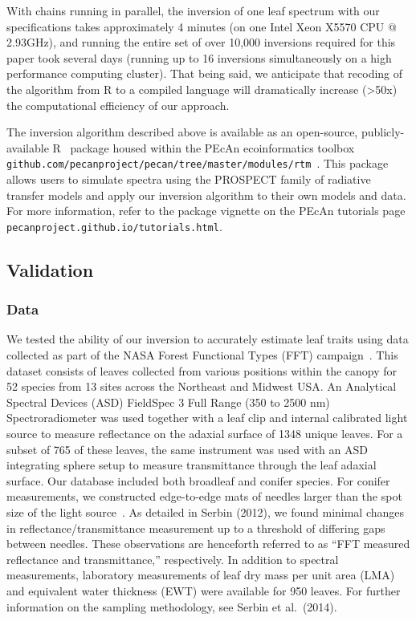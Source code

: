 With chains running in parallel, the inversion of one leaf spectrum with our specifications takes approximately 4 minutes (on one Intel Xeon X5570 CPU @ 2.93GHz), and running the entire set of over 10,000 inversions required for this paper took several days (running up to 16 inversions simultaneously on a high performance computing cluster).
That being said, we anticipate that recoding of the algorithm from R to a compiled language will dramatically increase (>50x) the computational efficiency of our approach.

The inversion algorithm described above is available as an open-source, publicly-available R~\cite{rstats} package housed within the PEcAn ecoinformatics toolbox \texttt{github.com/pecanproject/pecan/tree/master/modules/rtm}~\cite{dietze_improving_2013,lebauer_facilitating_2013}.
This package allows users to simulate spectra using the PROSPECT family of radiative transfer models and apply our inversion algorithm to their own models and data.
For more information, refer to the package vignette on the PEcAn tutorials page \texttt{pecanproject.github.io/tutorials.html}.

\subsection{Validation}

\subsubsection{Data}

We tested the ability of our inversion to accurately estimate leaf traits using data collected as part of the NASA Forest Functional Types (FFT) campaign~\cite{deel_2012_relationship,serbin_spectroscopic_2014,singh_imaging_2015}.
This dataset consists of leaves collected from various positions within the canopy for 52 species from 13 sites across the Northeast and Midwest USA\@.
An Analytical Spectral Devices (ASD) FieldSpec 3 Full Range (350 to 2500 nm) Spectroradiometer was used together with a leaf clip and internal calibrated light source to measure reflectance on the adaxial surface of 1348 unique leaves.
For a subset of 765 of these leaves, the same instrument was used with an ASD integrating sphere setup to measure transmittance through the leaf adaxial surface.
Our database included both broadleaf and conifer species.
For conifer measurements, we constructed edge-to-edge mats of needles larger than the spot size of the light source~\cite{serbin_2012_spectroscopic,singh_imaging_2015}.
As detailed in Serbin (2012), we found minimal changes in reflectance/transmittance measurement up to a threshold of differing gaps between needles. \nocite{serbin_2012_spectroscopic}
These observations are henceforth referred to as “FFT measured reflectance and transmittance,” respectively.
In addition to spectral measurements, laboratory measurements of leaf dry mass per unit area (LMA) and equivalent water thickness (EWT) were available for 950 leaves.
For further information on the sampling methodology, see Serbin et al.~(2014). \nocite{serbin_spectroscopic_2014}

